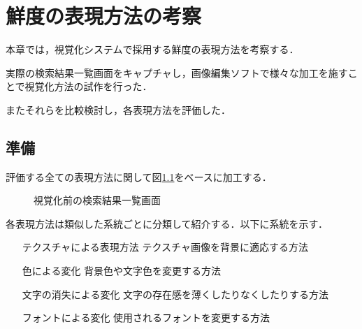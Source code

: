 \chapter{鮮度の表現方法の考察}
\label{chap:verification}

本章では，視覚化システムで採用する鮮度の表現方法を考察する．

実際の検索結果一覧画面をキャプチャし，画像編集ソフトで様々な加工を施すことで視覚化方法の試作を行った．

またそれらを比較検討し，各表現方法を評価した．

\newpage

\section{準備}

評価する全ての表現方法に関して図\ref{fig:ver-base}をベースに加工する．

\begin{figure}[htbp]
  \begin{center}
  \end{center}
  \caption{視覚化前の検索結果一覧画面}
  \label{fig:ver-base}
\end{figure}

各表現方法は類似した系統ごとに分類して紹介する．以下に系統を示す．

\begin{itemize}
  \item[テクスチャによる表現方法] テクスチャ画像を背景に適応する方法
  \item[色による変化] 背景色や文字色を変更する方法
  \item[文字の消失による変化] 文字の存在感を薄くしたりなくしたりする方法
  \item[フォントによる変化] 使用されるフォントを変更する方法
\end{itemize}

